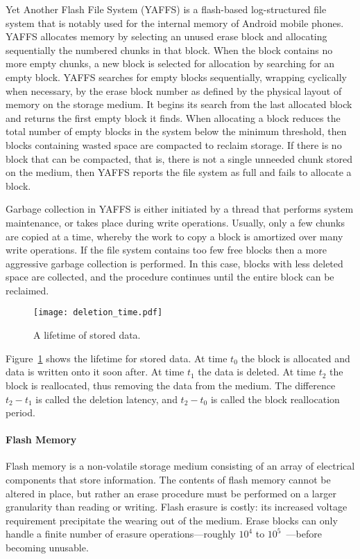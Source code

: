 \documentclass{acmtog}
\begin{document}
Yet Another Flash File System (YAFFS) is a flash-based log-structured file
system that is notably used for the internal memory  of Android mobile phones.
YAFFS allocates memory by selecting an unused erase block and allocating
sequentially the numbered chunks in that block. When the block contains no more empty
chunks, a new block is selected for allocation by searching for an empty
block. YAFFS  searches for empty blocks sequentially, wrapping cyclically when necessary, 
by the erase block number as defined by the
physical layout of memory on the storage medium. It begins its search from the
last allocated block and returns the first empty block it finds. When allocating
a block  reduces the total number of empty blocks in the system below the
minimum threshold, then blocks containing wasted space are
compacted to reclaim storage. If there is no block that can be
compacted, that is, there is not a single unneeded chunk stored on the medium, then
YAFFS reports the file system as full and fails to allocate a block.

Garbage collection in YAFFS is either initiated by a thread that
performs system maintenance, or takes place during write operations. Usually, only a few
chunks are copied at a time, whereby the work to copy a block is amortized over many
write operations. If the file system contains too few free blocks then a
more aggressive garbage collection is performed. In this case, blocks with
less deleted space are collected, and the procedure  continues until
the entire block can be reclaimed.

\begin{figure}[t]
\centering
\texttt{[image: deletion\_time.pdf]}
\caption{\small A lifetime of stored data. 
\label{f:deletion_time}\normalsize}
\end{figure}

Figure~\ref{f:deletion_time} shows the lifetime for stored data. At time $t_0$
the block is
allocated and data is written onto it soon after. At time $t_1$ the data is
deleted. At time $t_2$ the block is reallocated, thus removing the data from
the medium. The difference $t_2-t_1$ is called the deletion latency, and $t_2-t_0$ is called
the block reallocation period.


\paragraph{Flash Memory}
Flash memory is a non-volatile storage medium consisting of an array of
electrical components that store information. 
The contents of flash memory cannot be
altered in place, but rather an erase procedure must be performed on a
larger granularity than reading or writing.
Flash erasure is costly: its increased
voltage requirement precipitate the wearing out of the medium.
Erase blocks can only handle a finite
number of erasure operations---roughly $10^4$ to $10^5$~\cite{flashlife}---before
becoming unusable. 
\end{document}
